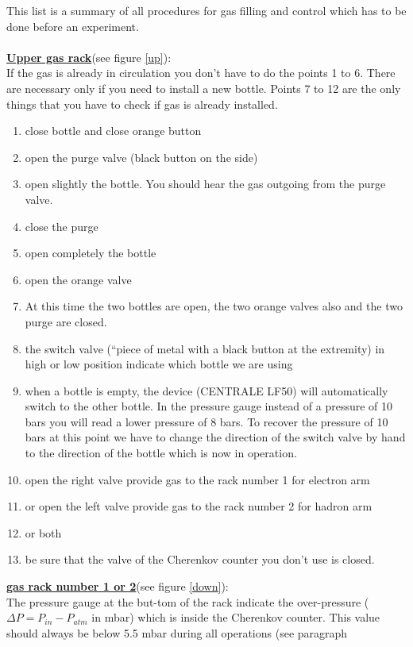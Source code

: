 \documentclass[12pt]{article}
\begin{document}
This list is a summary of all procedures for gas filling and control 
which has to be done before an experiment.\\
\\
\underline{{\bf Upper gas rack}}(see figure \ref{up}):\\
If the gas is already in circulation you don't have to do the points 1 to 6. 
There are necessary only if you need to install a new bottle. 
Points 7 to 12 are the only
things that you have to check if gas is already installed.
\begin{enumerate}
\item close bottle and close orange button
\item open the purge valve (black button on the side)
\item open slightly the bottle. You should hear the gas outgoing from the purge
valve.
\item close the purge
\item open completely the bottle
\item open the orange valve
\item At this time the two bottles are open, the two orange valves also 
and the two purge are closed.
\item the switch valve (``piece of metal with a black button at the extremity)
 in high or low position indicate which bottle we are using
\item when a bottle is empty, the device (CENTRALE LF50)
 will automatically switch to the 
other bottle. In the pressure gauge instead of a pressure of 10 bars you will
read a lower pressure of 8 bars. To recover the pressure of 10 bars at this
point we have to change the direction of the switch valve by hand to the
direction
of the bottle which is now in operation.
\item open the right valve provide gas to the rack number 1 for electron arm
\item or open the left valve provide gas to the rack number 2 for hadron arm
\item or both
\item be sure that the valve of the Cherenkov counter you don't use is closed.
\end{enumerate}
\underline{{\bf gas rack number 1 or 2}}(see figure \ref{down}):\\
The pressure gauge at the but-tom of the rack indicate the over-pressure 
($\Delta P=P_{in}-P_{atm}$ in mbar) which is inside the Cherenkov counter. This
value should always be below 5.5 mbar during all operations (see paragraph 
\end{document}
